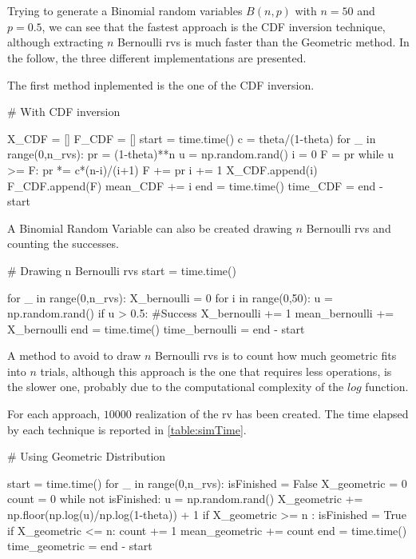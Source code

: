 \documentclass[11pt,a4paper]{article}
\begin{document}
\newpage
\section{}
Trying to generate a Binomial random variables $B(n,p)$ with $n=50$ and $p=0.5$, we can see that the fastest approach is the CDF inversion technique, although extracting $n$ Bernoulli rvs is much faster than the Geometric method.
In the follow, the three different implementations are presented.

The first method inplemented is the one of the CDF inversion.
\begin{python}
  # With CDF inversion

X_CDF = []
F_CDF = []
start = time.time()
c = theta/(1-theta)
for _ in range(0,n_rvs):
    pr = (1-theta)**n
    u = np.random.rand()
    i = 0
    F = pr
    while u >= F:
        pr *= c*(n-i)/(i+1)
        F += pr
        i += 1
    X_CDF.append(i)
    F_CDF.append(F)
    mean_CDF += i
end = time.time()
time_CDF = end - start
\end{python}

A Binomial Random Variable can also be created drawing $n$ Bernoulli rvs and counting the successes.
\begin{python}
  # Drawing n Bernoulli rvs
start = time.time()

for _ in range(0,n_rvs):
    X_bernoulli = 0
    for i in range(0,50):
        u = np.random.rand()
        if u > 0.5: #Success
            X_bernoulli += 1
    mean_bernoulli += X_bernoulli
end = time.time()
time_bernoulli = end - start
\end{python}

A method to avoid to draw $n$ Bernoulli rvs is to count how much geometric fits into $n$ trials, although this approach is the one that requires less operations, is the slower one, probably due to the computational complexity of the $log$ function.

For each approach, $10000$ realization of the rv has been created. The time elapsed by each technique is reported in \autoref{table:simTime}.

\begin{python}
  # Using Geometric Distribution

start = time.time()
for _ in range(0,n_rvs):
    isFinished = False
    X_geometric = 0
    count = 0
    while not isFinished:
        u = np.random.rand()
        X_geometric += np.floor(np.log(u)/np.log(1-theta)) + 1
        if X_geometric >= n :
            isFinished = True
        if X_geometric <= n:
            count += 1
    mean_geometric += count
end = time.time()
time_geometric = end - start
\end{python}
\end{document}
